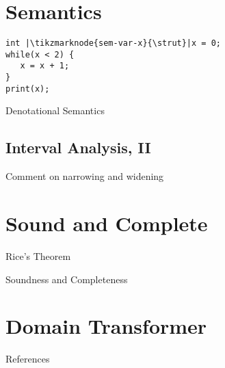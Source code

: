\documentclass[
   aspectratio=169, %
   10pt, %
   nosectionframes,
   uniqueslidenumber,
   professionalfonts
]{beamer}
\begin{document}
\section{Semantics}

\begin{frame}[fragile]{\insertsection}
\begin{verbatim}
int |\tikzmarknode{sem-var-x}{\strut}|x = 0;
while(x < 2) {
   x = x + 1;
}
print(x);
\end{verbatim}
\end{frame}

\begin{frame}{Denotational Semantics}
   
\end{frame}

\subsection{Interval Analysis, II}
\begin{frame}{\insertsubsection}
   
   Comment on narrowing and widening
\end{frame}

\section{Sound and Complete}
\begin{frame}{Rice's Theorem}
   
\end{frame}

\begin{frame}{Soundness and Completeness}
   
\end{frame}


   


\section{Domain Transformer}
\begin{frame}{\insertsection}
   
\end{frame}






\renewcommand*{\bibfont}{\tiny}

\AtBeginSection{}
\begin{frame}[allowframebreaks]{References}
   \printbibliography[title={}] %
\end{frame}
\end{document}
